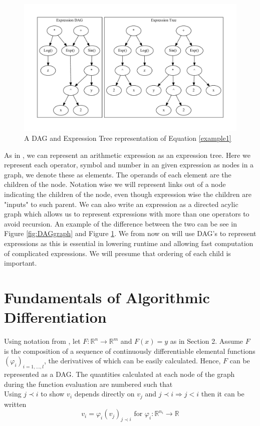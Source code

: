 \documentclass{article}
\begin{document}
\begin{figure}[h]
    \includegraphics[width=16cm]{images/Clustergraph.gv.pdf}
    \caption{A DAG and Expression Tree representation of Equation \ref{example1}}
    \label{fig:DAGgraph2}
\end{figure}


As in \cite{PoPBook}, we can represent an arithmetic expression as an expression tree. Here we represent each operator, symbol and number in an given expression as nodes in a graph, we denote these as elements. The operands of each element are the children of the node. Notation wise we will represent links out of a node indicating the children of the node, even though expression wise the children are "inputs" to such parent. We can also write an expression as a directed acylic graph which allows us to represent expressions with more than one operators to avoid recursion. An example of the difference between the two can be see in Figure \ref{fig:DAGgraph} and Figure \ref{fig:DAGgraph2}. We from now on will use DAG's to represent expressions as this is essential in lowering runtime and allowing fast computation of complicated expressions. We will presume that ordering of each child is important.

\section{Fundamentals of Algorithmic Differentiation}

Using notation from  \cite{evald}, let $F: \mathbb{R}^n \rightarrow \mathbb{R}^m$ and $F(x) = y$ as in Section 2. Assume $F$ is the composition of a sequence of continuously differentiable elemental functions $(\varphi_i)_{i=1,\ldots, l}$, the derivatives of which can be easily calculated. Hence, $F$ can be represented as a DAG. The quantities calculated at each node of the graph during the function evaluation are numbered such that
\begin{equation*}
    [ \underbrace{v_{1-n}, \ldots, v_0}_{x} , v_1, \ldots, v_{l-m}, \underbrace{v_{l-m+1}, \ldots, v_l}_{y}]
\end{equation*}
Using $j \prec i$ to show $v_i$ depends directly on $v_j$ and $j \prec i \Longrightarrow j < i$ then it can be written
\begin{equation*}
    v_i = \varphi_i (v_j)_{j \prec i} \text{ for } \varphi_i : \mathbb{R}^{n_i} \longrightarrow \mathbb{R}
\end{equation*}
\end{document}
